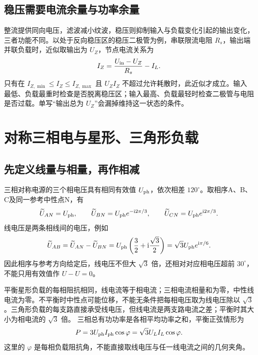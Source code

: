 \subsection{稳压需要电流余量与功率余量}
整流提供同向电压，滤波减小纹波，稳压则抑制输入与负载变化引起的输出变化，三者功能不同。以处于反向稳压区的稳压二极管为例，串联限流电阻 $R_s$，输出端并联负载时，近似取输出为 $U_Z$，节点电流关系为
\[
 I_Z=\frac{U_{\rm in}-U_Z}{R_s}-I_L.
\]
只有在 $I_{Z,\min}\le I_Z\le I_{Z,\max}$ 且 $U_ZI_Z$ 不超过允许耗散时，此近似才成立。输入最低、负载最重时检查是否脱离稳压区；输入最高、负载最轻时检查二极管与电阻是否过载。单写“输出总为 $U_Z$”会漏掉维持这一状态的条件。

\section{对称三相电与星形、三角形负载}
\subsection{先定义线量与相量，再作相减}
三相对称电源的三个相电压具有相同有效值 $U_{\rm ph}$，依次相差 $120^\circ$。取相序A、B、C及同一参考中性点N，有
\[
 \widetilde U_{AN}=U_{\rm ph},\qquad
 \widetilde U_{BN}=U_{\rm ph}e^{-\mathrm i2\pi/3},\qquad
 \widetilde U_{CN}=U_{\rm ph}e^{\mathrm i2\pi/3}.
\]
线电压是两条相线间的电压，例如
\[
 \widetilde U_{AB}=\widetilde U_{AN}-\widetilde U_{BN}
 =U_{\rm ph}\left(\frac32+\mathrm i\frac{\sqrt3}{2}\right)
 =\sqrt3U_{\rm ph}e^{\mathrm i\pi/6}.
\]
因此相序与参考方向给定后，线电压不但大 $\sqrt3$ 倍，还相对对应相电压超前 $30^\circ$，不能只用有效值作 $U-U=0$。

平衡星形负载的每相阻抗相同，线电流等于相电流；三相电流相量和为零，中性线电流为零。不平衡时中性点可能位移，不能无条件把每相电压取为线电压除以 $\sqrt3$。三角形负载的每支路直接承受线电压，但线电流是两支路电流之差；平衡时其大小为相电流的 $\sqrt3$ 倍。
三相总有功功率是各相平均功率之和，平衡正弦情形为
\[
 P=3U_{\rm ph}I_{\rm ph}\cos\varphi
 =\sqrt3U_LI_L\cos\varphi.
\]
这里的 $\varphi$ 是每相负载阻抗角，不能直接取线电压与任一线电流之间的几何夹角。

\newcommand{\QualityThreePhaseLoads}{%
\begin{tikzpicture}[>=Latex]
 \coordinate (N) at (2,1);\node[below right] at (N) {N};
 \foreach \x/\y/\a in {0/2/A,0/0/B,4/1/C}{
  \draw (\x,\y)--(N) node[midway,fill=white] {$R$};\fill (\x,\y) circle (1.5pt);\node[left] at (\x,\y) {$\a$};}
 \node[below] at (2,-.5) {星形：每支路为相—中性点};
 \begin{scope}[xshift=8cm]
  \coordinate (A) at (0,2);\coordinate (B) at (-1.5,0);\coordinate (C) at (1.5,0);
  \draw (A)--node[midway,fill=white] {$R$}(B)--node[midway,fill=white] {$R$}(C)--node[midway,fill=white] {$R$}(A);
  \node[above] at (A) {A};\node[left] at (B) {B};\node[right] at (C) {C};
  \node[below] at (0,-.5) {三角形：每支路为相—相};
 \end{scope}
\end{tikzpicture}}

